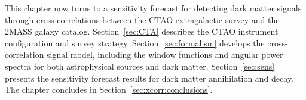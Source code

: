 %
%

This chapter now turns to a sensitivity forecast for detecting dark matter signals through cross-correlations between the CTAO extragalactic survey and the 2MASS galaxy catalog. Section~\ref{sec:CTA} describes the CTAO instrument configuration and survey strategy. Section~\ref{sec:formalism} develops the cross-correlation signal model, including the window functions and angular power spectra for both astrophysical sources and dark matter. Section~\ref{sec:sens} presents the sensitivity forecast results for dark matter annihilation and decay. The chapter concludes in Section~\ref{sec:xcorr:conclusions}.

